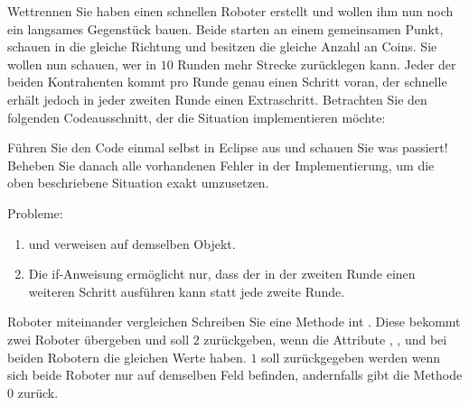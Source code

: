 \documentclass{../preamble}
\begin{document}
\begin{task}[credit = \stars{1}{3}]{Wettrennen}
    Sie haben einen schnellen Roboter  erstellt und wollen ihm nun noch ein langsames Gegenstück  bauen. Beide starten an einem gemeinsamen Punkt, schauen in die gleiche Richtung und besitzen die gleiche Anzahl an Coins. Sie wollen nun schauen, wer in \(10\) Runden mehr Strecke zurücklegen kann. Jeder der beiden Kontrahenten kommt pro Runde genau einen Schritt voran, der schnelle  erhält jedoch in jeder zweiten Runde einen Extraschritt. Betrachten Sie den folgenden Codeausschnitt, der die Situation implementieren möchte:
    
    Führen Sie den Code einmal selbst in Eclipse aus und schauen Sie was passiert! Beheben Sie danach alle vorhandenen Fehler in der Implementierung, um die oben beschriebene Situation exakt umzusetzen.

    \begin{solution}
        Probleme:
        \begin{enumerate}
            \item {} und  verweisen auf demselben Objekt.
            \item Die \textcolor{keywordcolor}{if}-Anweisung ermöglicht nur, dass der  in der zweiten Runde einen weiteren Schritt ausführen kann statt jede zweite Runde.
        \end{enumerate}
        
    \end{solution}
\end{task}

\clearpage

\begin{task}[credit = \stars{1}{3}]{Roboter miteinander vergleichen}
    Schreiben Sie eine Methode \textcolor{keywordcolor}{int} . Diese bekommt zwei Roboter übergeben und soll \(2\) zurückgeben, wenn die Attribute , ,  und  bei beiden Robotern die gleichen Werte haben. \(1\) soll zurückgegeben werden wenn sich beide Roboter nur auf demselben Feld befinden, andernfalls gibt die Methode \(0\) zurück.

    \begin{solution}
        
    \end{solution}
\end{task}
\end{document}

